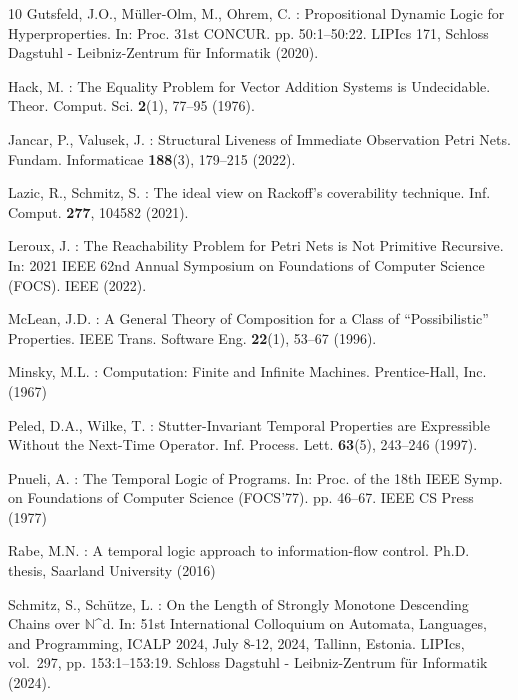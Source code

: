 \documentclass[10pt,a4paper]{article}
\let\mathbb\mathds
\begin{document}
\begin{thebibliography}{10}
	Gutsfeld, J.O., M{\"{u}}ller{-}Olm, M., Ohrem, C.
	: {Propositional Dynamic Logic for Hyperproperties}.
	In: Proc.
	31st {CONCUR}. pp. 50:1--50:22.
	LIPIcs 171, Schloss Dagstuhl - Leibniz-Zentrum f{\"{u}}r Informatik (2020).

	 Hack, M.
	: {The Equality Problem for Vector Addition Systems is Undecidable}.
	Theor.
	Comput.
	Sci.
	\textbf{2}(1),  77--95 (1976). 

	Jancar, P., Valusek, J.
	: {Structural Liveness of Immediate Observation Petri Nets}.
	Fundam.
	Informaticae \textbf{188}(3), 179--215 (2022).

	Lazic, R., Schmitz, S.
	: {The ideal view on Rackoff's coverability technique}.
	Inf.
	Comput.
	\textbf{277},  104582 (2021). 

	 Leroux, J.
	: {The Reachability Problem for Petri Nets is Not Primitive Recursive}.
	In: 2021 IEEE 62nd Annual Symposium on Foundations of Computer Science (FOCS).
	IEEE (2022).

	McLean, J.D.
	: {A General Theory of Composition for a Class of ``Possibilistic'' Properties}. {IEEE}
	Trans.
	Software Eng.
	\textbf{22}(1),  53--67 (1996). 

	Minsky, M.L.
	: {Computation: Finite and Infinite Machines}.
	Prentice-Hall, Inc.
	(1967)

	Peled, D.A., Wilke, T.
	: {Stutter-Invariant Temporal Properties are Expressible Without the Next-Time Operator}.
	Inf.
	Process.
	Lett.
	\textbf{63}(5),  243--246 (1997). 

	Pnueli, A.
	: {The Temporal Logic of Programs}.
	In: Proc.
	of the 18th IEEE Symp. on Foundations of Computer Science (FOCS'77). pp. 46--67.
	IEEE CS Press (1977)

	 Rabe, M.N.
	: {A temporal logic approach to information-flow control}.
	Ph.D.
	thesis, Saarland University (2016)

	Schmitz, S., Sch{\"{u}}tze, L.
	: {On the Length of Strongly Monotone Descending Chains over {\(\mathbb{N}\)}{\^{}}d}.
	In: 51st International Colloquium on Automata, Languages, and Programming, {ICALP} 2024, July 8-12, 2024, Tallinn, Estonia.
	LIPIcs, vol.~297, pp.
	153:1--153:19.
	Schloss Dagstuhl - Leibniz-Zentrum f{\"{u}}r Informatik (2024).


\end{thebibliography}
\end{document}
